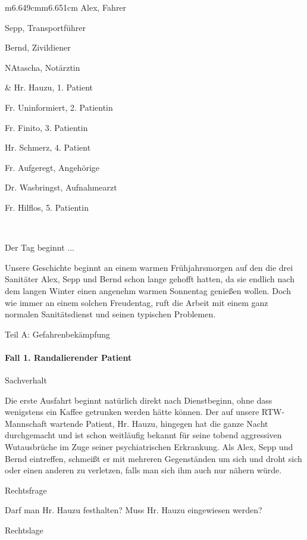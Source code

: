 \documentclass{article}
\begin{document}
\begin{center}
\tablehead{}\begin{supertabular}{m{6.649cm}m{6.651cm}}
Alex, Fahrer

Sepp, Transportf\"uhrer

Bernd, Zivildiener

NAtascha, Not\"arztin

 &
Hr. Hauzu, 1. Patient

Fr. Uninformiert, 2. Patientin

Fr. Finito, 3. Patientin

Hr. Schmerz, 4. Patient

Fr. Aufgeregt, Angeh\"orige

Dr. Wasbringst, Aufnahmearzt

Fr. Hilflos, 5. Patientin

\\
\end{supertabular}
\end{center}
Der Tag beginnt ...

Unsere Geschichte beginnt an einem warmen Fr\"uhjahrsmorgen auf den die
drei Sanit\"ater Alex, Sepp und Bernd schon lange gehofft hatten, da
sie endlich nach dem langen Winter einen angenehm warmen Sonnentag
genie{\ss}en wollen. Doch wie immer an einem solchen Freudentag, ruft
die Arbeit mit einem ganz normalen Sanit\"atsdienst und seinen
typischen Problemen.

Teil A: Gefahrenbek\"ampfung

\paragraph{Fall 1. Randalierender Patient}
Sachverhalt

Die erste Ausfahrt beginnt nat\"urlich direkt nach Dienstbeginn, ohne
dass wenigstens ein Kaffee getrunken werden h\"atte k\"onnen. Der auf
unsere RTW-Mannschaft wartende Patient, Hr. Hauzu, hingegen hat die
ganze Nacht durchgemacht und ist schon weitl\"aufig bekannt f\"ur seine
tobend aggressiven Wutausbr\"uche im Zuge seiner psychiatrischen
Erkrankung. Als Alex, Sepp und Bernd eintreffen, schmei{\ss}t er mit
mehreren Gegenst\"anden um sich und droht sich oder einen anderen zu
verletzen, falls man sich ihm auch nur n\"ahern w\"urde.

Rechtsfrage

Darf man Hr. Hauzu festhalten? Muss Hr. Hauzu eingewiesen werden? 

Rechtslage
\end{document}
